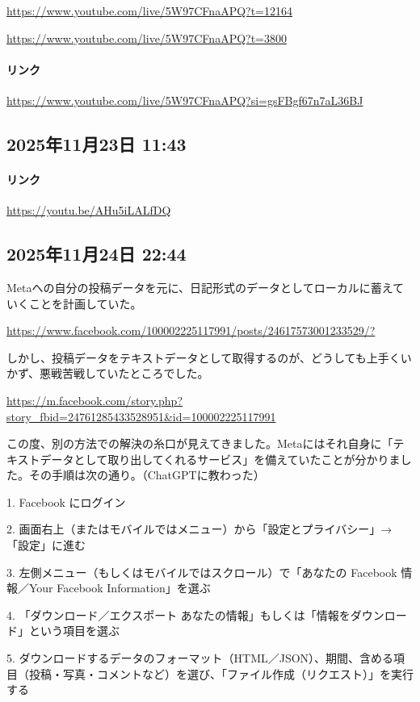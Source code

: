 \url{https://www.youtube.com/live/5W97CFnaAPQ?t=12164}

\url{https://www.youtube.com/live/5W97CFnaAPQ?t=3800}

\paragraph{リンク}
\url{https://www.youtube.com/live/5W97CFnaAPQ?si=gsFBgf67n7aL36BJ}

\subsection*{2025年11月23日 11:43}

\paragraph{リンク}
\url{https://youtu.be/AHu5iLALfDQ}

\subsection*{2025年11月24日 22:44}

Metaへの自分の投稿データを元に、日記形式のデータとしてローカルに蓄えていくことを計画していた。

\url{https://www.facebook.com/100002225117991/posts/24617573001233529/?}

しかし、投稿データをテキストデータとして取得するのが、どうしても上手くいかず、悪戦苦戦していたところでした。

\url{https://m.facebook.com/story.php?story_fbid=24761285433528951&id=100002225117991}

この度、別の方法での解決の糸口が見えてきました。Metaにはそれ自身に「テキストデータとして取り出してくれるサービス」を備えていたことが分かりました。その手順は次の通り。（ChatGPTに教わった）

1. Facebook にログイン

2. 画面右上（またはモバイルではメニュー）から「設定とプライバシー」→「設定」に進む

3. 左側メニュー（もしくはモバイルではスクロール）で「あなたの Facebook 情報／Your Facebook Information」を選ぶ

4. 「ダウンロード／エクスポート あなたの情報」もしくは「情報をダウンロード」という項目を選ぶ

5. ダウンロードするデータのフォーマット（HTML／JSON）、期間、含める項目（投稿・写真・コメントなど）を選び、「ファイル作成（リクエスト）」を実行する

